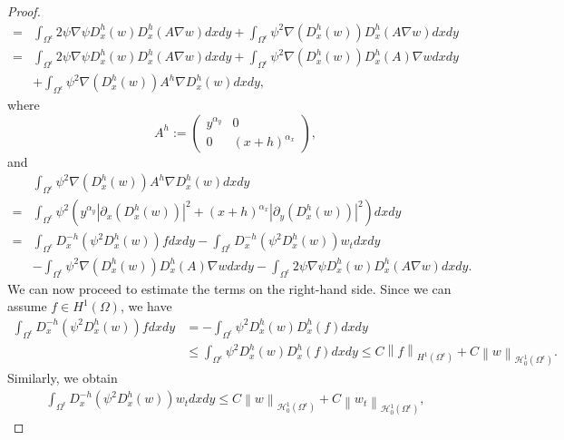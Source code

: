 \documentclass[9pt,reqno]{amsart}
\theoremstyle{plain}
\numberwithin{equation}{section}
\numberwithin{theorem}{section}
\def\Om{\Omega}
\def\Om{\Omega}
\begin{document}
\begin{proof}
\begin{equation*}
\begin{split}
				=&\int_{\Om^{\epsilon}}  2\psi \nabla \psi D_x^h (w) D_x^{h}(A\nabla w) dxdy + \int_{\Om^{\epsilon}}
				\psi^2 \nabla (D_x^h (w)) D_x^{h}(A\nabla w) dxdy\\
				=&\int_{\Om^{\epsilon}}  2\psi \nabla \psi D_x^h (w) D_x^{h}(A\nabla w) dxdy+\int_{\Om^{\epsilon}}\psi^2 \nabla (D_x^h (w)) D_x^{h}(A) \nabla w dxdy\\
				&+ \int_{\Om^{\epsilon}}\psi^2 \nabla (D_x^h (w)) A^h \nabla D_x^h (w)  dxdy,
			\end{split}
		\end{equation*}
		where
		\begin{equation}
			A^h := \begin{pmatrix} y^{\alpha_y} & 0 \\ 0 &(x+h)^{\alpha_x} \end{pmatrix},
		\end{equation}
		and
		\begin{equation}\label{re1}
			\begin{split}
				&\int_{\Om^{\epsilon}}\psi^2 \nabla (D_x^h (w)) A^h \nabla D_x^h (w)  dxdy\\
				=&\int_{\Om^{\epsilon}}\psi^2 \left( y^{\alpha_y} |\partial_{x} (D_x^h (w))|^2 + (x+h)^{\alpha_x} |\partial_{y} (D_x^h (w))|^2\right)  dxdy\\
				=&\int_{\Om^{\epsilon}} D_x^{-h}(\psi^2 D_x^h (w)) f dxdy - \int_{\Om^{\epsilon}} D_x^{-h}(\psi^2 D_x^h (w)) w_t dxdy\\
				&-\int_{\Om^{\epsilon}}\psi^2 \nabla (D_x^h (w)) D_x^{h}(A) \nabla w dxdy-\int_{\Om^{\epsilon}}  2\psi \nabla \psi D_x^h (w) D_x^{h}(A\nabla w) dxdy.
			\end{split}
		\end{equation}
		We can now proceed to estimate the terms on the right-hand side. Since we can assume $f \in H^1(\Omega)$, we have
		\begin{equation*}
			\begin{split}
				\int_{\Om^{\epsilon}} D_x^{-h}(\psi^2 D_x^h (w)) f dxdy &= -\int_{\Om^{\epsilon}} \psi^2 D_x^h (w) D_x^h (f) dxdy\\
				&\le \int_{\Om^{\epsilon}} \psi^2 D_x^h (w) D_x^h (f) dxdy\le C \left\| f\right\|_{H^1(\Om^{\epsilon})} + C \left\| w\right\|_{\mathcal{H}_0^1(\Om^{\epsilon})}.
			\end{split}
		\end{equation*}
		Similarly, we obtain 
		\begin{equation*}
			\begin{split}
				\int_{\Om^{\epsilon}} D_x^{-h}(\psi^2 D_x^h (w)) w_t dxdy \le C \left\| w\right\|_{\mathcal{H}_0^1(\Om^{\epsilon})} + C \left\| w_t\right\|_{\mathcal{H}_0^1(\Om^{\epsilon})},

\end{split}
\end{equation*}
\end{proof}
\end{document}
